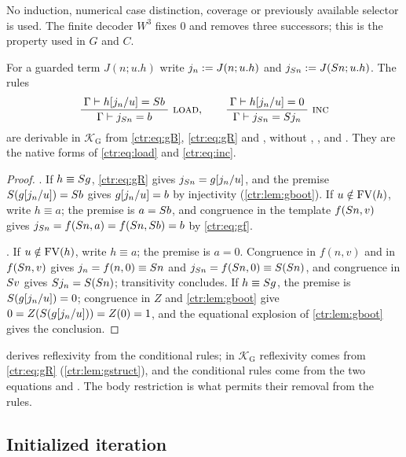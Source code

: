 No induction, numerical case distinction, coverage or previously available selector is used.
The finite decoder $W^3$ fixes $0$ and removes three successors; this is the property used in
$G$ and $C$.

\begin{proposition}\label{ctr:prop:grules}
For a guarded term $J(n;u.h)$ write $j_n\mathrel{:=} J(n;u.h)$ and $j_{S n}\mathrel{:=} J(S n;u.h)$.
The rules
\[
 \infrule{\Gamma\proves h\subst{j_n}{u}=\Suc b}{\Gamma\proves j_{\Suc n}=b}\ \rulename{Load},
 \qquad
 \infrule{\Gamma\proves h\subst{j_n}{u}=0}{\Gamma\proves j_{\Suc n}=\Suc j_n}\ \rulename{Inc}
\]
are derivable in $\mathcal K_{\mathrm G}$ from \eqref{ctr:eq:gB}, \eqref{ctr:eq:gR} and
, without , ,  and . They
are the native forms of \eqref{ctr:eq:load} and \eqref{ctr:eq:inc}.
\end{proposition}
\begin{proof}
. If $h\equiv S g$, \eqref{ctr:eq:gR} gives $j_{S n}=g[j_n/u]$, and
the premise $S(g[j_n/u])=S b$ gives $g[j_n/u]=b$ by injectivity
(\cref{ctr:lem:gboot}). If $u\notin\operatorname{FV}(h)$, write $h\equiv a$; the premise is $a=S b$,
and congruence in the template $f(S n,v)$ gives
$j_{S n}=f(S n,a)=f(S n,S b)=b$ by \eqref{ctr:eq:gf}.

. If $u\notin\operatorname{FV}(h)$, write $h\equiv a$; the premise is $a=0$. Congruence in
$f(n,v)$ and in $f(S n,v)$ gives $j_n=f(n,0)\equiv S n$ and
$j_{S n}=f(S n,0)\equiv S(S n)$, and congruence in $S v$ gives
$S j_n=S(S n)$; transitivity concludes. If $h\equiv S g$, the premise is
$S(g[j_n/u])=0$; congruence in $Z$ and \cref{ctr:lem:gboot} give
$0=Z(S(g[j_n/u]))=Z(0)=1$, and the equational explosion of \cref{ctr:lem:gboot}
gives the conclusion.
\end{proof}

 derives reflexivity from the conditional rules; in
$\mathcal K_{\mathrm G}$ reflexivity comes from \eqref{ctr:eq:gR}
(\cref{ctr:lem:gstruct}), and the conditional rules come from the two equations and
. The body restriction is what permits their removal from the rules.

\subsection{Initialized iteration}


